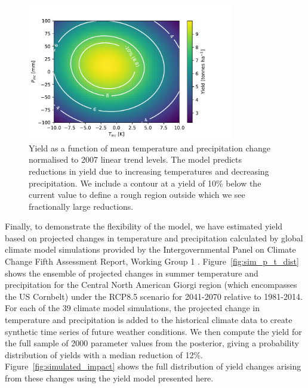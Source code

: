 \documentclass[12pt]{article}
\begin{document}
\begin{figure}
\centering
\includegraphics[width=0.8\textwidth]{./figures/temp_precip_impact_contour}
\caption{\label{fig:temp_precip_impact} Yield as a function of mean temperature and precipitation change normalised to 2007 linear trend levels. The model predicts reductions in yield due to increasing temperatures and decreasing precipitation. We include a contour at a yield of 10\% below the current value to define a rough region outside which we see fractionally large reductions.}
\end{figure}

Finally, to demonstrate the flexibility of the model, we have estimated yield based on projected changes in temperature and precipitation calculated by global climate model simulations provided by the Intergovernmental Panel on Climate Change Fifth Assessment Report, Working Group 1 \citep[http://www.climatechange2013.org/report/full-report/][]{ipcc2:2013}. Figure~\ref{fig:sim_p_t_dist} shows the ensemble of projected changes in summer temperature and precipitation for the Central North American Giorgi region (which encompasses the US Cornbelt) under the RCP8.5 scenario for 2041-2070 relative to 1981-2014. For each of the 39 climate model simulations, the projected change in temperature and precipitation is added to the historical climate data to create synthetic time series of future weather conditions. We then compute the yield for the full sample of 2000 parameter values from the posterior, giving a probability distribution of yields with a median reduction of 12\%. Figure~\ref{fig:simulated_impact} shows the full distribution of yield changes arising from these changes using the yield model presented here.
\end{document}

